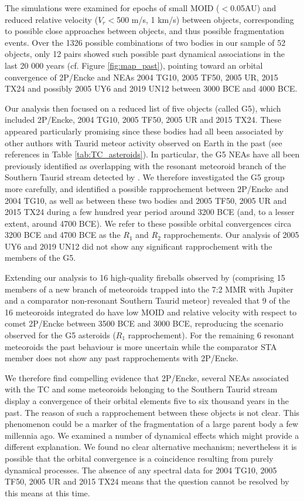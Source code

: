 \documentclass[letters,a4paper,fleqn,usenatbib]{mnras}
\begin{document}
 The simulations were examined for epochs of small MOID ($<$0.05AU) and reduced relative velocity ($V_r<$500 m/s, 1 km/s) between objects, corresponding to possible close approaches between objects, and thus possible fragmentation events. Over the 1326 possible combinations of two bodies in our sample of 52 objects, only 12 pairs showed such possible past dynamical associations in the last 20 000 years (cf. Figure \ref{fig:map_past}), pointing toward an orbital convergence of 2P/Encke and NEAs 2004 TG10, 2005 TF50, 2005 UR, 2015 TX24 and possibly 2005 UY6 and 2019 UN12 between 3000 BCE and 4000 BCE. 
 
 Our analysis then focused on a reduced list of five objects (called G5), which included 2P/Encke, 2004 TG10, 2005 TF50, 2005 UR and 2015 TX24. These appeared particularly promising since these bodies had all been associated by other authors with Taurid meteor activity observed on Earth in the past (see references in Table \ref{tab:TC_asteroids}). In particular, the G5 NEAs have all been previously identified as overlapping with the resonant meteoroid branch of the Southern Taurid stream detected by \cite{Spurny2017}. We therefore investigated the G5 group more carefully, and identified a possible rapprochement between 2P/Encke and 2004 TG10, as well as between these two bodies and 2005 TF50, 2005 UR and 2015 TX24 during a few hundred year period around 3200 BCE (and, to a lesser extent, around 4700 BCE). We refer to these possible orbital convergences circa 3200 BCE and 4700 BCE as the $R_1$ and $R_2$ rapprochements. Our analysis of 2005 UY6 and 2019 UN12 did not show any significant rapprochement with the members of the G5. 
 
Extending our analysis to 16 high-quality fireballs observed by \cite{Spurny2017} (comprising 15 members of a new branch of meteoroids trapped into the 7:2 MMR with Jupiter and a comparator non-resonant Southern Taurid meteor) revealed that 9 of the 16 meteoroids integrated do have low MOID and relative velocity with respect to comet 2P/Encke between 3500 BCE and 3000 BCE, reproducing the scenario observed for the G5 asteroids ($R_1$ rapprochement). For the remaining 6 resonant meteoroids the past behaviour is more uncertain while the comparator STA member does not show any past rapprochements with 2P/Encke.

We therefore find compelling evidence that 2P/Encke, several NEAs associated with the TC and some meteoroids belonging to the Southern Taurid stream display a convergence of their orbital elements five to six thousand years in the past. The reason of such a rapprochement between these objects is not clear. 
This phenomenon could be a marker of the fragmentation of a large parent body a few millennia ago. We examined a number of dynamical effects which might provide a different explanation. We found no clear alternative mechanism; nevertheless it is possible that the orbital convergence is a coincidence resulting from purely dynamical processes. The absence of any spectral data for 2004 TG10, 2005 TF50, 2005 UR and 2015 TX24 means that the question cannot be resolved by this means at this time.
	
\end{document}
